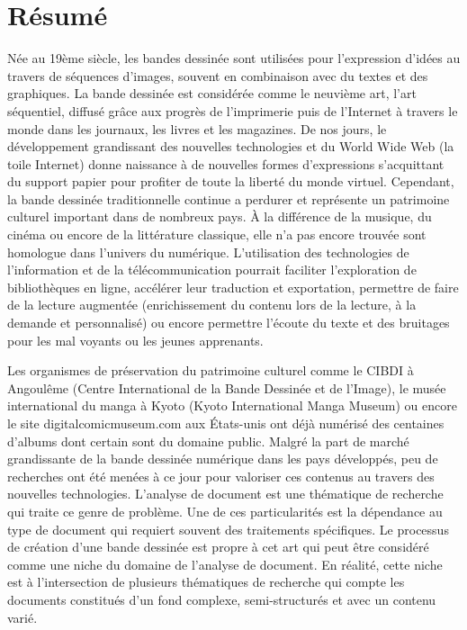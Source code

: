 \chapter*{R{\'e}sum{\'e}}

Née au 19ème siècle, les bandes dessinée sont utilisées pour l'expression d'idées au travers de séquences d'images, souvent en combinaison avec du textes et des graphiques.
La bande dessinée est considérée comme le neuvième art, l'art séquentiel, diffusé grâce aux progrès de l'imprimerie puis de l'Internet à travers le monde dans les journaux, les livres et les magazines.
De nos jours, le développement grandissant des nouvelles technologies et du World Wide Web (la toile Internet) donne naissance à de nouvelles formes d'expressions s'acquittant du support papier pour profiter de toute la liberté du monde virtuel.
Cependant, la bande dessinée traditionnelle continue a perdurer et représente un patrimoine culturel important dans de nombreux pays.
À la différence de la musique, du cinéma ou encore de la littérature classique, elle n'a pas encore trouvée sont homologue dans l'univers du numérique.
L'utilisation des technologies de l'information et de la télécommunication pourrait faciliter l'exploration de bibliothèques en ligne, accélérer leur traduction et exportation, permettre de faire de la lecture augmentée (enrichissement du contenu lors de la lecture, à la demande et personnalisé) ou encore permettre l'écoute du texte et des bruitages pour les mal voyants ou les jeunes apprenants.

Les organismes de préservation du patrimoine culturel comme le CIBDI à Angoulême (Centre International de la Bande Dessinée et de l'Image), le musée international du manga à Kyoto (Kyoto International Manga Museum) ou encore le site digitalcomicmuseum.com aux États-unis ont déjà numérisé des centaines d'albums dont certain sont du domaine public.
Malgré la part de marché grandissante de la bande dessinée numérique dans les pays développés, peu de recherches ont été menées à ce jour pour valoriser ces contenus au travers des nouvelles technologies.
L'analyse de document est une thématique de recherche qui traite ce genre de problème. Une de ces particularités est la dépendance au type de document qui requiert souvent des traitements spécifiques.
Le processus de création d'une bande dessinée est propre à cet art qui peut être considéré comme une niche du domaine de l'analyse de document.
En réalité, cette niche est à l'intersection de plusieurs thématiques de recherche qui compte les documents constitués d'un fond complexe, semi-structurés et avec un contenu varié.

